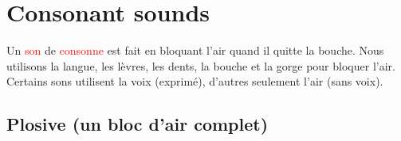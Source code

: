 \chapter{Consonant sounds}\label{chap:conson}


Un \textcolor{red}{son} de \textcolor{red}{consonne} est fait en bloquant l'air quand il quitte la
bouche. Nous utilisons la langue, les lèvres, les dents, la bouche et
la gorge pour bloquer l'air. Certains sons utilisent la voix
(exprimé), d'autres seulement l'air (sans voix).

\newpage
\minitoc
\newpage

\section{Plosive (un bloc d'air complet)}\label{sec:plosive}




\subsection{ }\label{subsec:p}



